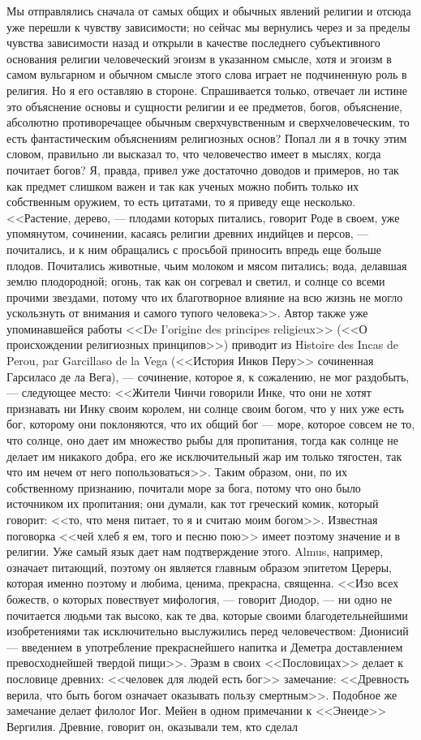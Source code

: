 \documentclass[12pt]{article}
\begin{document}
Мы отправлялись сначала от самых общих и обычных явлений религии и отсюда уже перешли к чувству зависимости; но сейчас мы вернулись через и за пределы чувства зависимости назад и открыли в качестве последнего субъективного основания религии человеческий эгоизм в указанном смысле, хотя и эгоизм в самом вульгарном и обычном смысле этого слова играет не подчиненную роль в религия. Но я его оставляю в стороне. Спрашивается только, отвечает ли истине это объяснение основы и сущности религии и ее предметов, богов, объяснение, абсолютно противоречащее обычным сверхчувственным и сверхчеловеческим, то есть фантастическим объяснениям религиозных основ? Попал ли я в точку этим словом, правильно ли высказал то, что человечество имеет в мыслях, когда почитает богов? Я, правда, привел уже достаточно доводов и примеров, но так как предмет слишком важен и так как ученых можно побить только их собственным оружием, то есть цитатами, то я приведу еще несколько. <<Растение, дерево, --- плодами которых питались, говорит Роде в своем, уже упомянутом, сочинении, касаясь религии древних индийцев и персов, --- почитались, и к ним обращались с просьбой приносить впредь еще больше плодов. Почитались животные, чьим молоком и мясом питались; вода, делавшая землю плодородной; огонь, так как он согревал и светил, и солнце со всеми прочими звездами, потому что их благотворное влияние на всю жизнь не могло ускользнуть от внимания и самого тупого человека>>. Автор также уже упоминавшейся работы <<De I'origine des principes religieux>> (<<О происхождении религиозных принципов>>) приводит из Histoire des Incas de Perou, par Garcillaso de la Vega (<<История Инков Перу>>  сочиненная Гарсиласо де ла Вега), --- сочинение, которое я, к сожалению, не мог раздобыть, --- следующее место: <<Жители Чинчи говорили Инке, что они не хотят признавать ни Инку своим королем, ни солнце своим богом, что у них уже есть бог, которому они поклоняются, что их общий бог  --- море, которое совсем не то, что солнце, оно дает им множество рыбы для пропитания, тогда как солнце не делает им никакого добра, его же исключительный жар им только тягостен, так что им нечем от него попользоваться>>. Таким образом, они, по их собственному признанию, почитали море за бога, потому что оно было источником их пропитания; они думали, как тот греческий комик, который говорит: <<то, что меня питает, то я и считаю моим богом>>. Известная поговорка <<чей хлеб я ем, того и песню пою>>  имеет поэтому значение и в религии. Уже самый язык дает нам подтверждение этого. Almus, например, означает питающий, поэтому он является главным образом эпитетом Цереры, которая именно поэтому и любима, ценима, прекрасна, священна. <<Изо всех божеств, о которых повествует мифология, --- говорит Диодор, --- ни одно не почитается людьми так высоко, как те два, которые своими благодетельнейшими изобретениями так исключительно выслужились перед человечеством: Дионисий --- введением в употребление прекраснейшего напитка и Деметра доставлением превосходнейшей твердой пищи>>. Эразм в своих <<Пословицах>> делает к пословице древних: <<человек для людей есть бог>>  замечание: <<Древность верила, что быть богом означает оказывать пользу смертным>>. Подобное же замечание делает филолог Иог. Мейен в одном примечании к <<Энеиде>> Вергилия. Древние, говорит он, оказывали тем, кто сделал 
\end{document}
